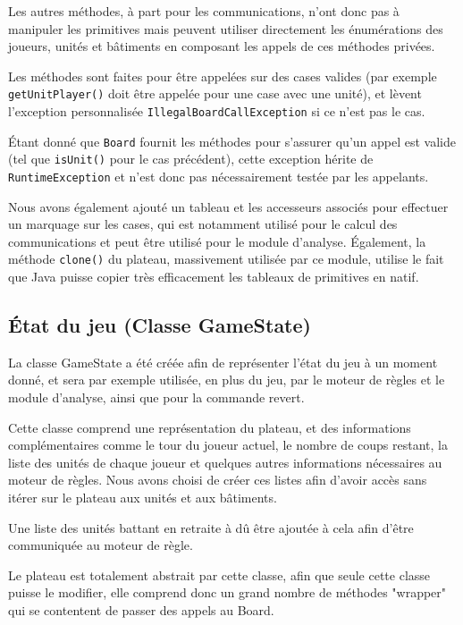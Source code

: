 \documentclass[a4paper]{report}
\begin{document}
Les autres méthodes, à part pour les communications, n'ont donc pas à manipuler les primitives mais peuvent utiliser directement les énumérations des joueurs, unités et bâtiments en composant les appels de ces méthodes privées.

Les méthodes sont faites pour être appelées sur des cases valides (par exemple {\tt getUnitPlayer()} doit être appelée pour une case avec une unité), et lèvent l'exception personnalisée \texttt{IllegalBoardCallException} si ce n'est pas le cas.

Étant donné que \texttt{Board} fournit les méthodes pour s'assurer qu'un appel est valide (tel que {\tt isUnit()} pour le cas précédent), cette exception hérite de \texttt{RuntimeException} et n'est donc pas nécessairement testée par les appelants.

Nous avons également ajouté un tableau et les accesseurs associés pour effectuer un marquage sur les cases, qui est notamment utilisé pour le calcul des communications et peut être utilisé pour le module d'analyse.
Également, la méthode \texttt{clone()} du plateau, massivement utilisée par ce module, utilise le fait que Java puisse copier très efficacement les tableaux de primitives en natif.

\subsection{\'Etat du jeu (Classe GameState)}

La classe GameState a été créée afin de représenter l'état du jeu à un moment donné, et sera par exemple utilisée, en plus du jeu, par le moteur de règles et le module d'analyse, ainsi que pour la commande revert.

Cette classe comprend une représentation du plateau, et des informations complémentaires comme le tour du joueur actuel, le nombre de coups restant, la liste des unités de chaque joueur et quelques autres informations nécessaires au moteur de règles. Nous avons choisi de créer ces listes afin d'avoir accès sans itérer sur le plateau aux unités et aux bâtiments.

Une liste des unités battant en retraite à dû être ajoutée à cela afin d'être communiquée au moteur de règle.

Le plateau est totalement abstrait par cette classe, afin que seule cette classe puisse le modifier, elle comprend donc un grand nombre de méthodes "wrapper" qui se contentent de passer des appels au Board.
\end{document}
